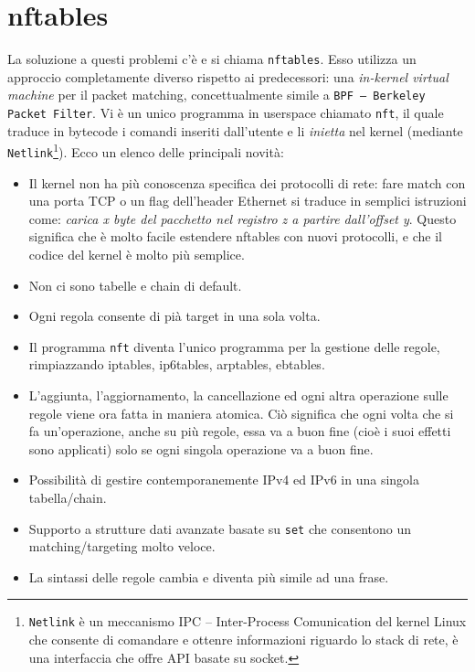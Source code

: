 \section{nftables}

La soluzione a questi problemi c'è e si chiama \texttt{nftables}.
Esso utilizza un approccio completamente diverso rispetto ai predecessori: una
\textit{in-kernel virtual machine} per il packet matching, concettualmente
simile a \texttt{BPF -- Berkeley Packet Filter}.
Vi è un unico programma in userspace chiamato
\texttt{nft}, il quale traduce in bytecode i comandi inseriti dall'utente e li
\textit{inietta} nel kernel (mediante \texttt{Netlink}\footnote{\texttt{Netlink}
	è un meccanismo IPC -- Inter-Process Comunication del kernel Linux che consente
	di comandare e ottenre informazioni riguardo lo stack di rete, è una interfaccia
che offre API basate su socket.}). Ecco un elenco
delle principali novità:
\begin{itemize}
	\item Il kernel non ha più conoscenza specifica
	      dei protocolli di rete: fare match con una porta TCP o un flag dell'header Ethernet
	      si traduce in semplici istruzioni come: \textit{carica x byte del pacchetto nel
	      registro z a partire dall'offset y}. Questo significa che è molto facile estendere
	      nftables con nuovi protocolli, e che il codice del kernel è molto più semplice.
	\item Non ci sono tabelle e chain di default.
	\item Ogni regola consente di pià target in una sola volta.
	\item Il programma \texttt{nft} diventa l'unico programma per la gestione delle regole,
	      rimpiazzando iptables, ip6tables, arptables, ebtables.
	\item L'aggiunta, l'aggiornamento, la cancellazione ed ogni altra operazione
	      sulle regole viene ora fatta in maniera atomica. Ciò significa che ogni volta che
	      si fa un'operazione, anche su più regole, essa va a buon fine (cioè i suoi effetti
	      sono applicati) solo se ogni singola operazione va a buon fine.
	\item Possibilità di gestire contemporanemente IPv4 ed IPv6 in una singola tabella/chain.
	\item Supporto a strutture dati avanzate basate su \texttt{set} che consentono un matching/targeting
	      molto veloce.
	\item La sintassi delle regole cambia e diventa più simile ad una frase.
\end{itemize}

